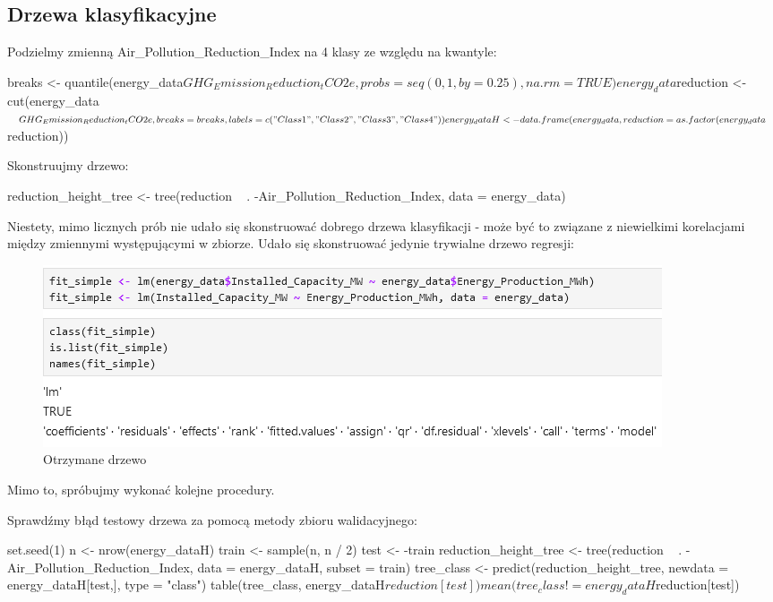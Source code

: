 \subsection{Drzewa klasyfikacyjne}
Podzielmy zmienną Air\_Pollution\_Reduction\_Index na 4 klasy ze względu na kwantyle:

\begin{Rcode}
breaks <- quantile(energy_data$GHG_Emission_Reduction_tCO2e, probs = seq(0, 1, by = 0.25), na.rm = TRUE)
energy_data$reduction <- cut(energy_data$GHG_Emission_Reduction_tCO2e, breaks = breaks, labels = c("Class 1", "Class 2", "Class 3", "Class 4"))

energy_dataH <- data.frame(energy_data, reduction = as.factor(energy_data$reduction))
\end{Rcode}

Skonstruujmy drzewo:

\begin{Rcode}
reduction_height_tree <- tree(reduction ~ . -Air_Pollution_Reduction_Index, data = energy_data)
\end{Rcode}

Niestety, mimo licznych prób nie udało się skonstruować dobrego drzewa klasyfikacji - może być to związane z niewielkimi korelacjami między zmiennymi występującymi w zbiorze. Udało się skonstruować jedynie trywialne drzewo regresji:

\begin{figure}[H]
    \centering
    \includegraphics[width=1\linewidth]{lab1/obraz.png}
    \caption{Otrzymane drzewo}
    \label{fig:enter-label}
\end{figure}

Mimo to, spróbujmy wykonać kolejne procedury.

Sprawdźmy błąd testowy drzewa za pomocą metody zbioru walidacyjnego:

\begin{Rcode}
set.seed(1)
n <- nrow(energy_dataH)
train <- sample(n, n / 2)
test <- -train
reduction_height_tree <- tree(reduction ~ . - Air_Pollution_Reduction_Index, data = energy_dataH, subset = train)
tree_class <- predict(reduction_height_tree, newdata = energy_dataH[test,], type = "class")
table(tree_class, energy_dataH$reduction[test])
mean(tree_class != energy_dataH$reduction[test])
\end{Rcode}

